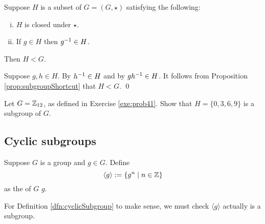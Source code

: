 \documentclass[../algebraNotesMSRI-UP2016.tex]{subfiles}
\begin{document}
\begin{frame}[c]
\begin{ex}[cf. Problem 49]
Suppose $H$ is a subset of $G=(G,\star)$ satisfying the following:
\begin{enumerate}[(i)]
\item\label{ex:prob49-1} $H$ is closed under $\star$.
\item\label{ex:prob49-2} If $g\in H$ then $g^{-1}\in H$.
\end{enumerate}
Then $H< G$.
\end{ex}

\smallGap
\pf
%
Suppose $g,h\in H$.  By  $h^{-1}\in H$ and by  $gh^{-1}\in H$.  It follows from Proposition \ref{prop:subgroupShortcut} that $H<G$.
\qed
\end{frame}

\begin{frame}[c]{}{}
\begin{exe}[cf. Problem 50]\label{exe:prob50}
Let $G=\mathbb Z_{12}$, as defined in Exercise \ref{exe:prob41}.  Show that $H=\{0,3,6,9\}$ is a subgroup of $G$.
\end{exe}
\end{frame}

\subsection[\subsecname]{Cyclic subgroups}\label{subsec:cyclic}
\begin{frame}[c]{\subsecname}
\begin{dfn}\label{dfn:cyclicSubgroup}
Suppose $G$ is a group and $g\in G$.  Define
\[
\langle g\rangle:=\{g^n\mid n\in\mathbb Z\}
\]
as the  of $G$  $g$.
\end{dfn}

\smallGap
\begin{exe}\label{exe:cyclicSubgroup}
For Definition \ref{dfn:cyclicSubgroup} to make sense, we must check $\langle g\rangle$ actually is a subgroup.  
\end{exe}
\end{frame}
\end{document}
